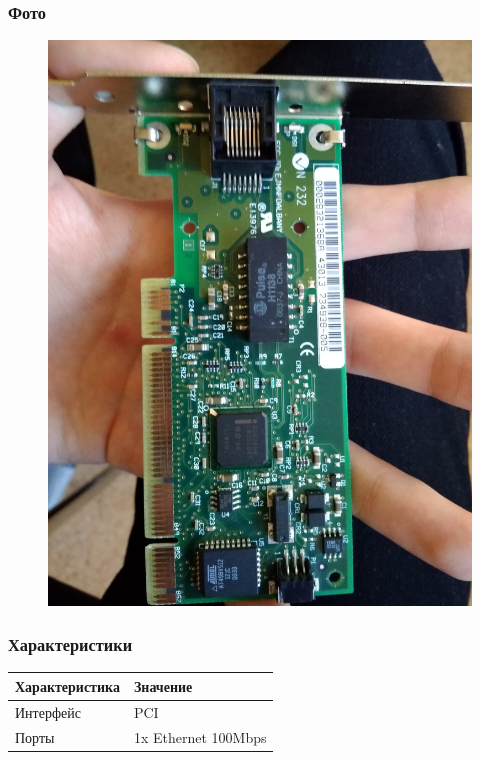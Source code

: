 \documentclass[a4paper]{article}
\begin{document}
\subsubsection{Фото}
\begin{figure}[H]
\centering
\includegraphics[scale=0.1]{nc.jpg} 
\end{figure}
\subsubsection{Характеристики}
\begin{table}[H]
\centering
\begin{tabular}{|l|l|}
\hline
Характеристика & Значение \\
\hline
Интерфейс & PCI \\
Порты & 1x Ethernet 100Mbps \\
\hline
\end{tabular}
\end{table}
\end{document}
